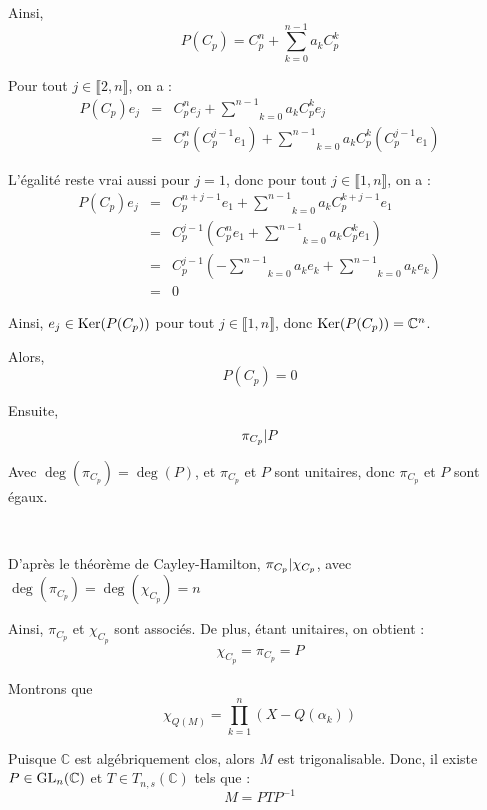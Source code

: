 Ainsi,
\[ P (C_p) = C^n_p + \underset{k = 0}{\overset{n - 1}{\sum}} a_k C^k_p \]


Pour tout $j \in \llbracket 2, n \rrbracket$, on a :
\begin{eqnarray*}
  P (C_p) e_j & = & C^n_p e_j + \underset{k = 0}{\overset{n - 1}{\sum}} a_k
  C^k_p e_j\\
  & = & C_p^n (C_p^{j - 1} e_1) + \underset{k = 0}{\overset{n - 1}{\sum}} a_k
  C^k_p (C_p^{j - 1} e_1)
\end{eqnarray*}


L'{\'e}galit{\'e} reste vrai aussi pour $j = 1$, donc pour tout $j \in
\llbracket 1, n \rrbracket$, on a :
\[ \begin{array}{lll}
     P (C_p) e_j & = & C^{n + j - 1}_p e_1 + \underset{k = 0}{\overset{n -
     1}{\sum}} a_k C^{k + j - 1}_p e_1\\
     & = & C^{j - 1}_p \left( C^n_p e_1 + \underset{k = 0}{\overset{n -
     1}{\sum}} a_k C^k_p e_1 \right)\\
     & = & C^{j - 1}_p \left( - \underset{k = 0}{\overset{n - 1}{\sum}} a_k
     e_k + \underset{k = 0}{\overset{n - 1}{\sum}} a_k e_k \right)\\
     & = & 0
   \end{array} \]


Ainsi, $e_j \in \operatorname{Ker} (P (C_p))$ pour tout $j \in \llbracket 1, n
\rrbracket$, donc $\operatorname{Ker} (P (C_p)) =\mathbb{C}^n$.

Alors,
\[ P (C_p) = 0 \]


Ensuite,
\[ \pi_{C_p} | P  \]


Avec $\deg (\pi_{C_p}) = \deg (P)$, et $\pi_{C_p}$ et $P$ sont unitaires, donc
$\pi_{C_p}$ et $P$ sont {\'e}gaux.

\

 D'apr{\`e}s le th{\'e}or{\`e}me de Cayley-Hamilton,
$\pi_{C_p} | \chi_{C_p} $, avec $\deg (\pi_{C_p}) = \deg
(\chi_{C_p}) = n$

Ainsi, $\pi_{C_p}$ et $\chi_{C_p}$ sont associ{\'e}s. De plus, {\'e}tant
unitaires, on obtient :
\[ \chi_{C_p} = \pi_{C_p} = P \]


 Montrons que
\[ \chi_{Q (M)} = \underset{k = 1}{\overset{n}{\prod}} (X - Q (\alpha_k)) \]


Puisque $\mathbb{C}$ est alg{\'e}briquement clos, alors $M$ est
trigonalisable. Donc, il existe $P \in \operatorname{GL}_n (\mathbb{C})$ et $T \in
T_{n, s} (\mathbb{C})$ tels que :
\[ M = P T P^{- 1} \]


